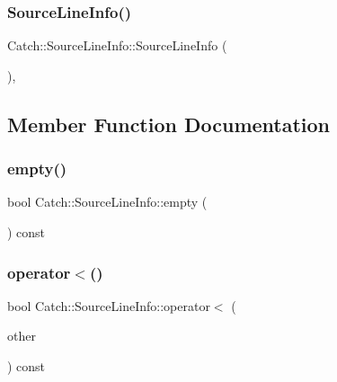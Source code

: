 \subsubsection{SourceLineInfo()\hspace{0.1cm}{\footnotesize\ttfamily [4/4]}}
{\footnotesize\ttfamily Catch\+::\+Source\+Line\+Info\+::\+Source\+Line\+Info (\begin{DoxyParamCaption}\item[{\textbf{ Source\+Line\+Info} \&\&}]{ }\end{DoxyParamCaption})\hspace{0.3cm}{\ttfamily [default]}, {\ttfamily [noexcept]}}



\subsection{Member Function Documentation}
\mbox{\label{struct_catch_1_1_source_line_info_a10a5b5b7dff82971879c2eb8d83f9b3b}} 
\subsubsection{empty()}
{\footnotesize\ttfamily bool Catch\+::\+Source\+Line\+Info\+::empty (\begin{DoxyParamCaption}{ }\end{DoxyParamCaption}) const\hspace{0.3cm}{\ttfamily [noexcept]}}

\mbox{\label{struct_catch_1_1_source_line_info_af77415416919d2d6030b4be085b92f7a}} 
\subsubsection{operator$<$()}
{\footnotesize\ttfamily bool Catch\+::\+Source\+Line\+Info\+::operator$<$ (\begin{DoxyParamCaption}\item[{\textbf{ Source\+Line\+Info} const \&}]{other }\end{DoxyParamCaption}) const\hspace{0.3cm}{\ttfamily [noexcept]}}

\mbox{\label{struct_catch_1_1_source_line_info_a1a6cfc0197357ef4e329bb256aa8a354}} 
